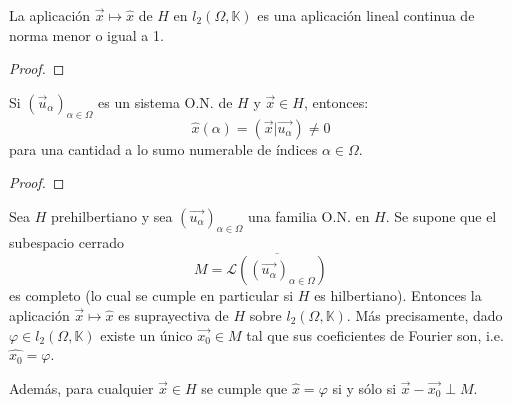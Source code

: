 \documentclass[12pt]{report}
\theoremstyle{largebreak}
\newcommand\pint[2]{\ensuremath{\left(#1\big| #2\right)}}
\begin{document}
    \begin{cor}
        La aplicación $\vec{x}\mapsto\hat{x}$ de $H$ en $l_2(\Omega,\mathbb{K})$ es una aplicación lineal continua de norma menor o igual a 1.
    \end{cor}

    \begin{proof}
        
    \end{proof}
        
    \begin{cor}
        Si $(\vec{u}_\alpha)_{\alpha\in\Omega}$ es un sistema O.N. de $H$ y $\vec{x}\in H$, entonces:
        \begin{equation*}
            \hat{x}(\alpha)=\pint{\vec{x}}{\vec{u_\alpha}}\neq0
        \end{equation*}
        para una cantidad a lo sumo numerable de índices $\alpha\in\Omega$.
    \end{cor}

    \begin{proof}
        
    \end{proof}

    \begin{theor}
        Sea $H$ prehilbertiano y sea $(\vec{u_\alpha})_{\alpha\in\Omega}$ una familia O.N. en $H$. Se supone que el subespacio cerrado
        \begin{equation*}
            M=\overline{\mathcal{L}((\vec{u_\alpha})_{\alpha\in\Omega})}
        \end{equation*}
        es completo (lo cual se cumple en particular si $H$ es hilbertiano). Entonces la aplicación $\vec{x}\mapsto\hat{x}$ es suprayectiva de $H$ sobre $l_2(\Omega,\mathbb{K})$. Más precisamente, dado $\varphi\in l_2(\Omega,\mathbb{K})$ existe un único $\vec{x_0}\in M$ tal que sus coeficientes de Fourier son, i.e. $\hat{x_0}=\varphi$.
        
        Además, para cualquier $\vec{x}\in H$ se cumple que $\hat{x}=\varphi$ si y sólo si $\vec{x}-\vec{x_0}\perp M$. 
    \end{theor}
\end{document}
